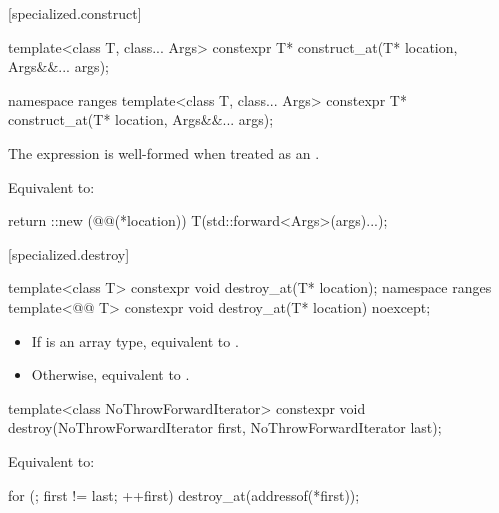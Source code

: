 [specialized.construct]{}

\begin{itemdecl}
template<class T, class... Args>
  constexpr T* construct_at(T* location, Args&&... args);

namespace ranges {
  template<class T, class... Args>
    constexpr T* construct_at(T* location, Args&&... args);
}
\end{itemdecl}

\begin{itemdescr}
\pnum
\constraints
The expression 
is well-formed when treated as an .

\pnum
\effects
Equivalent to:
\begin{codeblock}
return ::new (@@(*location)) T(std::forward<Args>(args)...);
\end{codeblock}
\end{itemdescr}

[specialized.destroy]{}

%
\begin{itemdecl}
template<class T>
  constexpr void destroy_at(T* location);
namespace ranges {
  template<@@ T>
    constexpr void destroy_at(T* location) noexcept;
}
\end{itemdecl}

\begin{itemdescr}
\pnum
\effects
\begin{itemize}
\item If  is an array type, equivalent to
  .
\item Otherwise, equivalent to
  .
\end{itemize}
\end{itemdescr}

%
\begin{itemdecl}
template<class NoThrowForwardIterator>
  constexpr void destroy(NoThrowForwardIterator first, NoThrowForwardIterator last);
\end{itemdecl}

\begin{itemdescr}
\pnum
\effects
Equivalent to:
\begin{codeblock}
for (; first != last; ++first)
  destroy_at(addressof(*first));
\end{codeblock}
\end{itemdescr}

